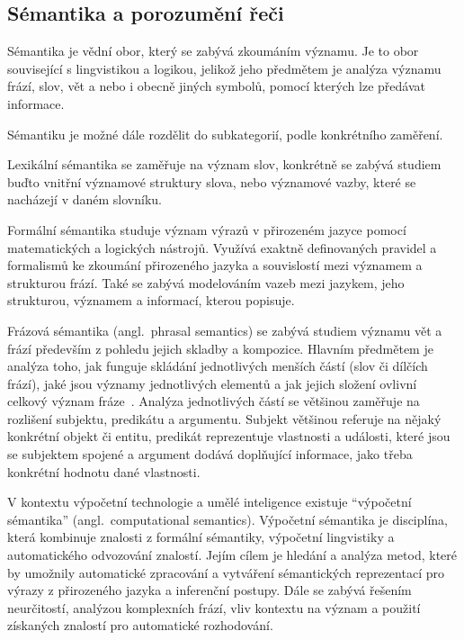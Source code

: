 \subsection{Sémantika a porozumění řeči}
Sémantika je vědní obor, který se zabývá zkoumáním významu.
Je to obor související s lingvistikou a logikou, jelikož jeho předmětem je analýza významu frází, slov, vět a nebo i obecně jiných symbolů,
pomocí kterých lze předávat informace.~\cite{palmer1981semantics}

Sémantiku je možné dále rozdělit do subkategorií, podle konkrétního zaměření.

Lexikální sémantika se zaměřuje na význam slov, konkrétně se zabývá studiem buďto vnitřní významové struktury slova,
nebo významové vazby, které se nacházejí v daném slovníku.~\cite{lexical-semantics}

Formální sémantika studuje význam výrazů v přirozeném jazyce pomocí matematických a logických nástrojů.
Využívá exaktně definovaných pravidel a formalismů ke zkoumání přirozeného jazyka a souvislostí mezi významem a strukturou frází.
Také se zabývá modelováním vazeb mezi jazykem, jeho strukturou, významem a informací, kterou popisuje.~\cite{rajman2007speech}~\cite{portner2008formal}

Frázová sémantika (angl.~phrasal semantics) se zabývá studiem významu vět a frází především z pohledu jejich skladby a kompozice.
Hlavním předmětem je analýza toho, jak funguje skládání jednotlivých menších částí (slov či dílčích frází),
jaké jsou významy jednotlivých elementů a jak jejich složení ovlivní celkový význam fráze~\cite{riemer2010introducing-semantic}.
Analýza jednotlivých částí se většinou zaměřuje na rozlišení subjektu, predikátu a argumentu.
Subjekt většinou referuje na nějaký konkrétní objekt či entitu, predikát reprezentuje vlastnosti a události, které jsou se subjektem spojené
a argument dodává doplňující informace, jako třeba konkrétní hodnotu dané vlastnosti.~\cite{fasold2006introduction}

V kontextu výpočetní technologie a umělé inteligence existuje \enquote{výpočetní sémantika} (angl.~computational semantics).
Výpočetní sémantika je disciplína, která kombinuje znalosti z formální sémantiky, výpočetní lingvistiky a automatického odvozování znalostí.
Jejím cílem je hledání a analýza metod, které by umožnily automatické zpracování a vytváření
sémantických reprezentací pro výrazy z přirozeného jazyka a inferenční postupy.
Dále se zabývá řešením neurčitostí, analýzou komplexních frází,
vliv kontextu na význam a použití získaných znalostí pro automatické rozhodování.~\cite{computational-semantics-blackburn-bos}~\cite{computation-semantics}

